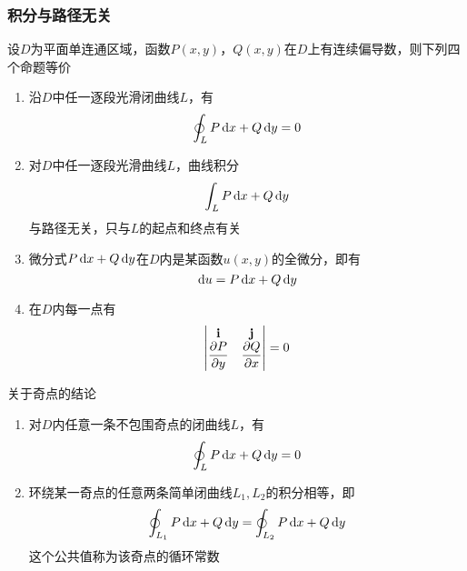 \subsubsection{积分与路径无关}
\begin{theorem}
设$D$为平面单连通区域，函数$P(x,y)$，$Q(x,y)$在$D$上有连续偏导数，则下列四个命题等价
\begin{enumerate}
	\item 沿$D$中任一逐段光滑闭曲线$L$，有
	\[\oint_LP\,\mathrm{d} x+Q\,\mathrm{d} y=0\]
	\item 对$D$中任一逐段光滑曲线$L$，曲线积分
	\[\int_LP\,\mathrm{d} x+Q\,\mathrm{d} y\]
	与路径无关，只与$L$的起点和终点有关
	\item 微分式$P\,\mathrm{d} x+Q\,\mathrm{d} y$在$D$内是某函数$u(x,y)$的全微分，即有
	\[\,\mathrm{d} u=P\,\mathrm{d} x+Q\,\mathrm{d} y\]
	\item 在$D$内每一点有
	\[\begin{vmatrix}\mathbf{i}&\mathbf{j}\\\dfrac{\partial P}{\partial y}&\dfrac{\partial Q}{\partial x}\end{vmatrix}=0\]
\end{enumerate}
\end{theorem}
\begin{theorem}[奇点]
关于奇点的结论
\begin{enumerate}
	\item 对$D$内任意一条不包围奇点的闭曲线$L$，有
	\[\oint_LP\,\mathrm{d} x+Q\,\mathrm{d} y=0\]
	\item 环绕某一奇点的任意两条简单闭曲线$L_1,L_2$的积分相等，即
	\[\oint_{L_1}P\,\mathrm{d} x+Q\,\mathrm{d} y=\oint_{L_2}P\,\mathrm{d} x+Q\,\mathrm{d} y\]
	这个公共值称为该奇点的循环常数
\end{enumerate}
\end{theorem}